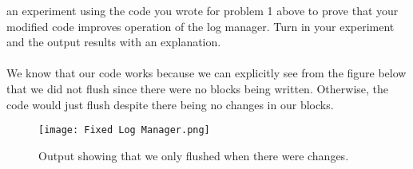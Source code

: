 \documentclass [letter,12pt] {article}
\begin{document}
\begin{enumerate}[(a)]
            an experiment using the code you wrote for problem 1 above
            to prove that your modified code improves operation of the 
            log manager. Turn in your experiment and the output results 
            with an explanation.
            \\\\
            We know that our code works because we can explicitly see from the
            figure below that we did not flush since there were no blocks being
            written. Otherwise, the code would just flush despite there being
            no changes in our blocks.
            \begin{figure}[htp]
                \centering
                \texttt{[image: Fixed Log Manager.png]}
                \caption{Output showing that we only flushed when there were changes.}
                \label{fig:fxiedfilemgroutput}
            \end{figure}
    \end{enumerate}
\end{document}
